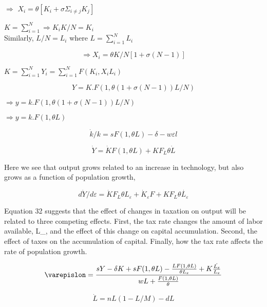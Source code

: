 \documentclass[12pt]{article}%
\begin{document}
$\Rightarrow$ $X_{i} = \theta [K_{i} + \sigma \Sigma_{i\neq j} K_{j}]$

$K = \sum_{i=1}^{N} \Rightarrow K_{i} K/N = K_{i}$ 
\\ Similarly, $L/N = L_{i}$ where  $L = \sum_{i=1}^{N} L_{i}$

\begin{equation}
\Rightarrow X_{i} = \theta K/N [1 + \sigma(N-1)]
\end{equation}

$K = \sum_{i=1}^{N} Y_{i} = \sum_{i=1}^{N}  F (K_{i}, X_{i} L_{i})$

\begin{equation}
Y = K . F(1, \theta (1 + \sigma(N-1))L/N)
\end{equation}

$\Rightarrow y = k . F(1, \theta (1 + \sigma(N-1))L/N)$

$\Rightarrow y = k . F(1, \theta L)$

\begin{equation}
\dot{k}/k = s F(1, \theta L) - \delta -w\varepsilon l 
\end{equation}


\begin{equation}
\dot{Y} = \dot{K}F(1, \theta L) + KF_L\theta\dot{L}
\end{equation}

Here we see that output grows related to an increase in technology, but also grows as a function of population growth, 

\begin{equation}
d\dot{Y}/d\varepsilon = \dot{K}F_L \theta L_\varepsilon +\dot{K}_\varepsilon F + KF_L\theta \dot{L_\varepsilon}
\end{equation}

Equation 32 suggests that the effect of changes in taxation on output will be related to three competing effects. First, the tax rate changes the amount of labor available, L_\varepsilon, and the effect of this change on capital accumulation. Second, the effect of taxes on the accumulation of capital. Finally, how the tax rate affects the rate of population growth. 

\begin{equation}
\varepislon= \frac{sY - \delta K + sF(1, \theta L) - \frac{LF(1, \theta L)}{\theta L_\varepsilon} + K\frac{\dot{L_\varepsilon}}{L_\varepsilon}}{wL + \frac{F(1, \theta L)}{\theta}}
\end{equation}

\begin{equation}
\dot{L} = nL(1 - L/M) - dL
\end{equation}
\end{document}
